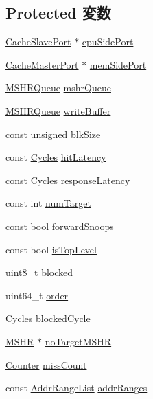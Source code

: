 \subsection*{Protected 変数}
\begin{DoxyCompactItemize}
\item 
\hyperlink{classBaseCache_1_1CacheSlavePort}{CacheSlavePort} $\ast$ \hyperlink{classBaseCache_a14913ffff181227d085f25a95e6ada42}{cpuSidePort}
\item 
\hyperlink{classBaseCache_1_1CacheMasterPort}{CacheMasterPort} $\ast$ \hyperlink{classBaseCache_af29f0c640654a651bf26558b4b39623b}{memSidePort}
\item 
\hyperlink{classMSHRQueue}{MSHRQueue} \hyperlink{classBaseCache_aa73933a75144caca7a7d3d77cf285c23}{mshrQueue}
\item 
\hyperlink{classMSHRQueue}{MSHRQueue} \hyperlink{classBaseCache_ad44ec41bd8517224df8584b5e7fbe372}{writeBuffer}
\item 
const unsigned \hyperlink{classBaseCache_a87b03496724866a3daf3e8ebeb831290}{blkSize}
\item 
const \hyperlink{classCycles}{Cycles} \hyperlink{classBaseCache_a4075fdc5720f8f0f57c379c396e74718}{hitLatency}
\item 
const \hyperlink{classCycles}{Cycles} \hyperlink{classBaseCache_ab3672589b3ea30e547b2a30f50d814eb}{responseLatency}
\item 
const int \hyperlink{classBaseCache_a3c2d74d5455e7b8ccefd3edb38c291de}{numTarget}
\item 
const bool \hyperlink{classBaseCache_ac8d6ebb7f62e1afe78ddc7c774316d66}{forwardSnoops}
\item 
const bool \hyperlink{classBaseCache_a9d8582d06c3d2f59711d1bbf7d383df3}{isTopLevel}
\item 
uint8\_\-t \hyperlink{classBaseCache_a1618f82ecde158c73f229ae4cc0f6f8b}{blocked}
\item 
uint64\_\-t \hyperlink{classBaseCache_ab26c49bd3bef351f3658df29505d78dd}{order}
\item 
\hyperlink{classCycles}{Cycles} \hyperlink{classBaseCache_ae1148c48e3f5a892c0576b7e10eec8d0}{blockedCycle}
\item 
\hyperlink{classMSHR}{MSHR} $\ast$ \hyperlink{classBaseCache_ae429d09cb5301f34a7eb7e6c765d4441}{noTargetMSHR}
\item 
\hyperlink{base_2types_8hh_ae1475755791765b8e6f6a8bb091e273e}{Counter} \hyperlink{classBaseCache_aec6f1d9f27ecfada36c359137b578352}{missCount}
\item 
const \hyperlink{classstd_1_1list}{AddrRangeList} \hyperlink{classBaseCache_aad23e5e7311cbfb1189b674238254c39}{addrRanges}
\end{DoxyCompactItemize}
